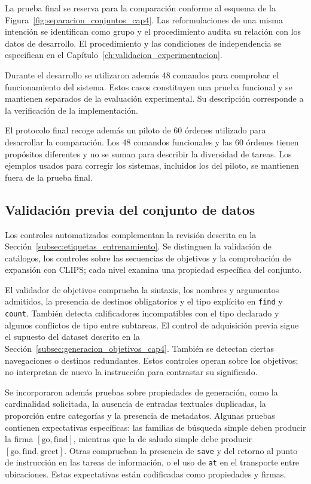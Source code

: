 La prueba final se reserva para la comparación conforme al esquema de la Figura~\ref{fig:separacion_conjuntos_cap4}. Las reformulaciones de una misma intención se identifican como grupo y el procedimiento audita su relación con los datos de desarrollo. El procedimiento y las condiciones de independencia se especifican en el Capítulo~\ref{ch:validacion_experimentacion}.

Durante el desarrollo se utilizaron además 48 comandos para comprobar el
funcionamiento del sistema. Estos casos constituyen una prueba funcional
y se mantienen separados de la evaluación experimental. Su descripción
corresponde a la verificación de la implementación.

El protocolo final recoge además un piloto de 60 órdenes utilizado para desarrollar la comparación. Los 48 comandos funcionales y las 60 órdenes tienen propósitos diferentes y no se suman para describir la diversidad de tareas. Los ejemplos usados para corregir los sistemas, incluidos los del piloto, se mantienen fuera de la prueba final.




\subsection{Validación previa del conjunto de datos}
\label{subsec:validacion_datos}

Los controles automatizados complementan la revisión descrita en la Sección~\ref{subsec:etiquetas_entrenamiento}. Se distinguen la validación de catálogos, los controles sobre las secuencias de objetivos y la comprobación de expansión con CLIPS; cada nivel examina una propiedad específica del conjunto.

El validador de objetivos comprueba la sintaxis, los nombres y argumentos
admitidos, la presencia de destinos obligatorios y el tipo explícito en
\texttt{find} y \texttt{count}. También detecta calificadores incompatibles
con el tipo declarado y algunos conflictos de tipo entre subtareas.
El control de adquisición previa sigue el supuesto del dataset descrito en la Sección~\ref{subsec:generacion_objetivos_cap4}. También se detectan ciertas navegaciones o destinos redundantes. Estos controles operan sobre los objetivos; no interpretan de nuevo la instrucción para contrastar su significado.

Se incorporaron además pruebas sobre propiedades de generación, como la
cardinalidad solicitada, la ausencia de entradas textuales duplicadas,
la proporción entre categorías y la presencia de metadatos. Algunas
pruebas contienen expectativas específicas: las familias de búsqueda
simple deben producir la firma \([\mathrm{go},\mathrm{find}]\), mientras
que la de saludo simple debe producir
\([\mathrm{go},\mathrm{find},\mathrm{greet}]\). Otras comprueban la
presencia de \texttt{save} y del retorno al punto de instrucción en las
tareas de información, o el uso de \texttt{at} en el transporte entre
ubicaciones. Estas expectativas están codificadas como propiedades y firmas.

